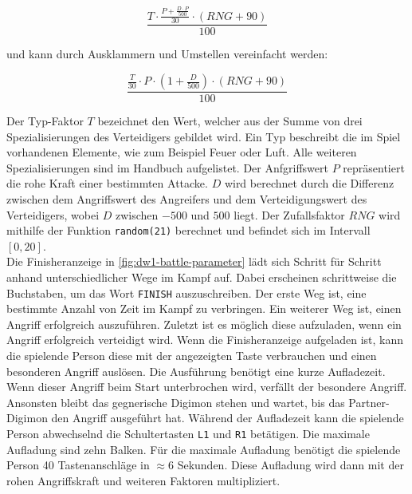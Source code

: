 \begin{equation}
 \frac{T \cdot \frac{P + \frac{D \cdot P}{500}}{30} \cdot (RNG + 90)}{100}   
\end{equation}

und kann durch Ausklammern und Umstellen vereinfacht werden:

\begin{equation}
  \frac{\frac{T}{30} \cdot  P \cdot (1 + \frac{D}{500}) \cdot (RNG + 90)}{100}
\end{equation}

Der Typ-Faktor $T$ bezeichnet den Wert, welcher aus der Summe von drei Spezialisierungen des Verteidigers gebildet wird. Ein Typ beschreibt die im Spiel vorhandenen Elemente, wie zum Beispiel Feuer oder Luft. Alle weiteren Spezialisierungen sind im Handbuch aufgelistet. Der Anfgriffswert $P$ repräsentiert die rohe Kraft einer bestimmten Attacke. $D$ wird berechnet durch die Differenz zwischen dem Angriffswert des Angreifers und dem Verteidigungswert des Verteidigers, wobei $D$ zwischen $-500$ und $500$ liegt. Der Zufallsfaktor $RNG$ wird mithilfe der Funktion \texttt{random(21)} berechnet und befindet sich im Intervall $[0, 20]$.\\

Die Finisheranzeige in \autoref{fig:dw1-battle-parameter} lädt sich Schritt für Schritt anhand unterschiedlicher Wege im Kampf auf. Dabei erscheinen schrittweise die Buchstaben, um das Wort \texttt{FINISH} auszuschreiben. Der erste Weg ist, eine bestimmte Anzahl von Zeit im Kampf zu verbringen. Ein weiterer Weg ist, einen Angriff erfolgreich auszuführen. Zuletzt ist es möglich diese aufzuladen, wenn ein Angriff erfolgreich verteidigt wird. Wenn die Finisheranzeige aufgeladen ist, kann die spielende Person diese mit der angezeigten Taste verbrauchen und einen besonderen Angriff auslösen. Die Ausführung benötigt eine kurze Aufladezeit. Wenn dieser Angriff beim Start unterbrochen wird, verfällt der besondere Angriff. Ansonsten bleibt das gegnerische Digimon stehen und wartet, bis das Partner-Digimon den Angriff ausgeführt hat. Während der Aufladezeit kann die spielende Person abwechselnd die Schultertasten \texttt{L1} und \texttt{R1} betätigen.
Die maximale Aufladung sind zehn Balken. Für die maximale Aufladung benötigt die spielende Person 40 Tastenanschläge in $\approx 6$ Sekunden. Diese Aufladung wird dann mit der rohen Angriffskraft und weiteren Faktoren multipliziert.\\

